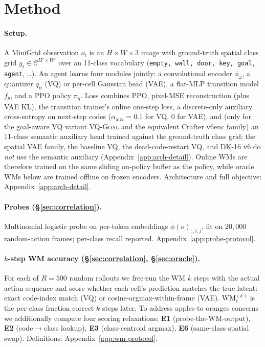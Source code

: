 \documentclass{article}
\newcommand{\encVQGoal}{\textsc{VQ-Goal}}
\begin{document}
\section{Method}\label{sec:method}

\paragraph{Setup.} A MiniGrid observation $o_t$ is an $H{\times}W{\times}3$ image with ground-truth spatial class grid $y_t \in \mathcal{C}^{H'{\times}W'}$ over an 11-class vocabulary (\texttt{empty, wall, door, key, goal, agent}, \ldots). An agent learns four modules jointly: a convolutional encoder $\phi_\omega$, a quantizer $q_\psi$ (VQ) or per-cell Gaussian head (VAE), a flat-MLP transition model $f_\theta$, and a PPO policy $\pi_\eta$. Loss combines PPO, pixel-MSE reconstruction (plus VAE KL), the transition trainer's online one-step loss, a discrete-only auxiliary cross-entropy on next-step codes ($\alpha_{\text{aux}}{=}0.1$ for VQ, $0$ for VAE), and (only for the goal-aware VQ variant \encVQGoal{} and the equivalent Crafter v6enc family) an 11-class semantic auxiliary head trained against the ground-truth class grid; the spatial VAE family, the baseline VQ, the dead-code-restart VQ, and DK-16 v6 do \emph{not} use the semantic auxiliary (Appendix~\ref{app:arch-detail}). Online WMs are therefore trained on the same sliding on-policy buffer as the policy, while oracle WMs below are trained offline on frozen encoders. Architecture and full objective: Appendix~\ref{app:arch-detail}.

\paragraph{Probes (\S\ref{sec:correlation}).} Multinomial logistic probe on per-token embeddings $\tilde\phi(o)_{:,i,j}$, fit on $20{,}000$ random-action frames; per-class recall reported. Appendix~\ref{app:probe-protocol}.

\paragraph{$k$-step WM accuracy (\S\ref{sec:correlation}, \S\ref{sec:oracle}).} For each of $R{=}500$ random rollouts we free-run the WM $k$ steps with the actual action sequence and score whether each cell's prediction matches the true latent: exact code-index match (VQ) or cosine-argmax-within-frame (VAE). $\text{WM}_c^{(k)}$ is the per-class fraction correct $k$ steps later. To address apples-to-oranges concerns we additionally compute four scoring relaxations: \textbf{E1} (probe-the-WM-output), \textbf{E2} (code$\to$class lookup), \textbf{E3} (class-centroid argmax), \textbf{E6} (same-class spatial swap). Definitions: Appendix~\ref{app:wm-protocol}.
\end{document}

